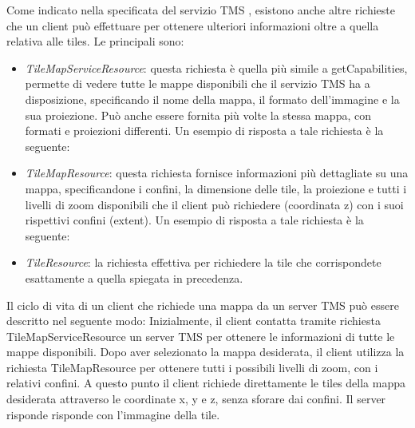 Come indicato nella specificata del servizio TMS \cite{DocumentazioneTMS}, esistono anche altre richieste che un client può effettuare per ottenere ulteriori informazioni oltre a quella relativa alle tiles. Le principali sono:
\begin{itemize}
      \item \textit{TileMapServiceResource}: questa richiesta è quella più simile a getCapabilities, permette di vedere tutte le mappe disponibili che il servizio TMS ha a disposizione, specificando il nome della mappa, il formato dell'immagine e la sua proiezione. Può anche essere fornita più volte la stessa mappa, con formati e proiezioni differenti. Un esempio di risposta a tale richiesta è la seguente:
            \lstset{basicstyle=\footnotesize\ttfamily}
            
      \item \textit{TileMapResource}: questa richiesta fornisce informazioni più dettagliate su una mappa, specificandone i confini, la dimensione delle tile, la proiezione e tutti i livelli di zoom disponibili che il client può richiedere (coordinata z) con i suoi rispettivi confini (extent). Un esempio di risposta a tale richiesta è la seguente:
            \lstset{basicstyle=\footnotesize\ttfamily}
            
      \item \textit{TileResource}: la richiesta effettiva per richiedere la tile che corrispondete esattamente a quella spiegata in precedenza.
\end{itemize}
Il ciclo di vita di un client che richiede una mappa da un server TMS può essere descritto nel seguente modo:
Inizialmente, il client contatta tramite richiesta TileMapServiceResource un server TMS per ottenere le informazioni di tutte le mappe disponibili.
Dopo aver selezionato la mappa desiderata, il client utilizza la richiesta TileMapResource per ottenere tutti i possibili livelli di zoom, con i relativi confini.
A questo punto il client richiede direttamente le tiles della mappa desiderata attraverso le coordinate x, y e z, senza sforare dai confini. Il server risponde risponde con l'immagine della tile.



